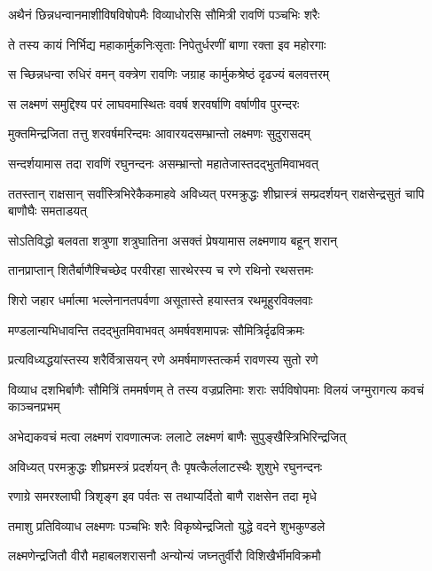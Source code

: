 \twolineshloka
{अथैनं छिन्नधन्वानमाशीविषविषोपमैः}
{विव्याधोरसि सौमित्री रावणिं पञ्चभिः शरैः} %

\twolineshloka
{ते तस्य कायं निर्भिद्य महाकार्मुकनिःसृताः}
{निपेतुर्धरणीं बाणा रक्ता इव महोरगाः} %

\twolineshloka
{स च्छिन्नधन्वा रुधिरं वमन् वक्त्रेण रावणिः}
{जग्राह कार्मुकश्रेष्ठं दृढज्यं बलवत्तरम्} %

\twolineshloka
{स लक्ष्मणं समुद्दिश्य परं लाघवमास्थितः}
{ववर्ष शरवर्षाणि वर्षाणीव पुरन्दरः} %

\twolineshloka
{मुक्तमिन्द्रजिता तत्तु शरवर्षमरिन्दमः}
{आवारयदसम्भ्रान्तो लक्ष्मणः सुदुरासदम्} %

\twolineshloka
{सन्दर्शयामास तदा रावणिं रघुनन्दनः}
{असम्भ्रान्तो महातेजास्तदद्भुतमिवाभवत्} %

\threelineshloka
{ततस्तान् राक्षसान् सर्वांस्त्रिभिरेकैकमाहवे}
{अविध्यत् परमक्रुद्धः शीघ्रास्त्रं सम्प्रदर्शयन्}
{राक्षसेन्द्रसुतं चापि बाणौघैः समताडयत्} %

\twolineshloka
{सोऽतिविद्धो बलवता शत्रुणा शत्रुघातिना}
{असक्तं प्रेषयामास लक्ष्मणाय बहून् शरान्} %

\twolineshloka
{तानप्राप्तान् शितैर्बाणैश्चिच्छेद परवीरहा}
{सारथेरस्य च रणे रथिनो रथसत्तमः} %

\twolineshloka
{शिरो जहार धर्मात्मा भल्लेनानतपर्वणा}
{असूतास्ते हयास्तत्र रथमूहुरविक्लवाः} %

\twolineshloka
{मण्डलान्यभिधावन्ति तदद्भुतमिवाभवत्}
{अमर्षवशमापन्नः सौमित्रिर्दृढविक्रमः} %

\twolineshloka
{प्रत्यविध्यद्धयांस्तस्य शरैर्वित्रासयन् रणे}
{अमर्षमाणस्तत्कर्म रावणस्य सुतो रणे} %

\threelineshloka
{विव्याध दशभिर्बाणैः सौमित्रिं तममर्षणम्}
{ते तस्य वज्रप्रतिमाः शराः सर्पविषोपमाः}
{विलयं जग्मुरागत्य कवचं काञ्चनप्रभम्} %

\twolineshloka
{अभेद्यकवचं मत्वा लक्ष्मणं रावणात्मजः}
{ललाटे लक्ष्मणं बाणैः सुपुङ्खैस्त्रिभिरिन्द्रजित्} %

\twolineshloka
{अविध्यत् परमक्रुद्धः शीघ्रमस्त्रं प्रदर्शयन्}
{तैः पृषत्कैर्ललाटस्थैः शुशुभे रघुनन्दनः} %

\twolineshloka
{रणाग्रे समरश्लाघी त्रिशृङ्ग इव पर्वतः}
{स तथाप्यर्दितो बाणै राक्षसेन तदा मृधे} %

\twolineshloka
{तमाशु प्रतिविव्याध लक्ष्मणः पञ्चभिः शरैः}
{विकृष्येन्द्रजितो युद्धे वदने शुभकुण्डले} %

\twolineshloka
{लक्ष्मणेन्द्रजितौ वीरौ महाबलशरासनौ}
{अन्योन्यं जघ्नतुर्वीरौ विशिखैर्भीमविक्रमौ} %


